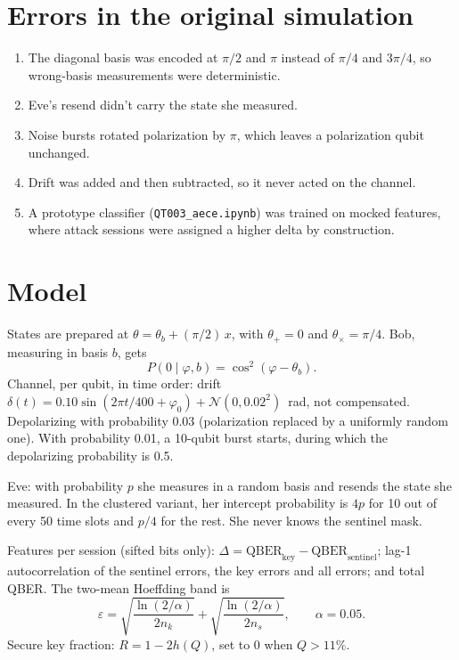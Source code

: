 \documentclass[11pt]{article}
\begin{document}
\section{Errors in the original simulation}
\begin{enumerate}
\item The diagonal basis was encoded at $\pi/2$ and $\pi$ instead of $\pi/4$ and $3\pi/4$, so wrong-basis measurements were deterministic.
\item Eve's resend didn't carry the state she measured.
\item Noise bursts rotated polarization by $\pi$, which leaves a polarization qubit unchanged.
\item Drift was added and then subtracted, so it never acted on the channel.
\item A prototype classifier (\texttt{QT003\_aece.ipynb}) was trained on mocked features, where attack sessions were assigned a higher delta by construction.
\end{enumerate}

\section{Model}
States are prepared at $\theta=\theta_b+(\pi/2)\,x$, with $\theta_+=0$ and $\theta_\times=\pi/4$. Bob, measuring in basis $b$, gets
\[ P(0\mid\varphi,b)=\cos^2(\varphi-\theta_b). \]
Channel, per qubit, in time order: drift $\delta(t)=0.10\sin(2\pi t/400+\varphi_0)+\mathcal N(0,0.02^2)$~rad, not compensated. Depolarizing with probability 0.03 (polarization replaced by a uniformly random one). With probability 0.01, a 10-qubit burst starts, during which the depolarizing probability is 0.5.

Eve: with probability $p$ she measures in a random basis and resends the state she measured. In the clustered variant, her intercept probability is $4p$ for 10 out of every 50 time slots and $p/4$ for the rest. She never knows the sentinel mask.

Features per session (sifted bits only): $\Delta=\mathrm{QBER}_{\text{key}}-\mathrm{QBER}_{\text{sentinel}}$; lag-1 autocorrelation of the sentinel errors, the key errors and all errors; and total QBER. The two-mean Hoeffding band is
\[ \varepsilon=\sqrt{\frac{\ln(2/\alpha)}{2n_k}}+\sqrt{\frac{\ln(2/\alpha)}{2n_s}},\qquad \alpha=0.05. \]
Secure key fraction: $R=1-2h(Q)$, set to 0 when $Q>11\%$.
\end{document}
